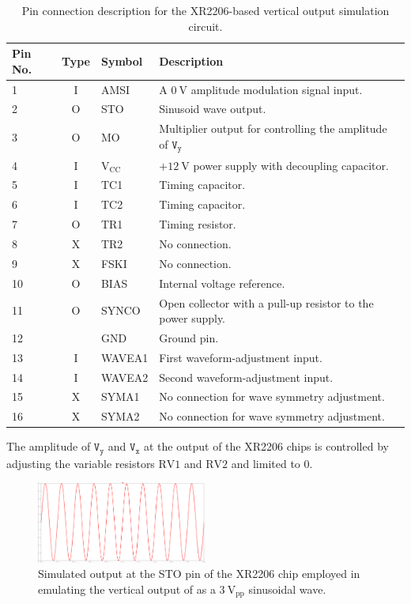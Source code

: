 \documentclass[class=report,11pt,crop=false]{standalone}
\begin{document}
	\begin{table}[ht!]
		\caption{Pin connection description for the XR2206-based vertical output simulation circuit.}
		\label{tab:voec-pin-description}
		\centering
		\begin{tabular}{|m{3em}|c|m{10em}|m{18em}|}
			\hline
			\textbf{Pin No.} & \textbf{Type}	& \textbf{Symbol} & \textbf{Description} \\
			\hline
			1	&	I	& AMSI 	& A $\SI{0}{\volt}$ amplitude modulation signal input.\\
			\hline
			2	&   O	& STO	&	Sinusoid wave output.\\
			\hline
			3	& 	O	& MO	&	Multiplier output for controlling the amplitude of $\texttt{V}_\texttt{y}$\\
			\hline
			4	& 	I	& $\text{V}_{\text{CC}}$ & $+\SI{12}{\volt}$ power supply with decoupling capacitor.\\
			\hline
			5	& 	I	& TC1	&	Timing capacitor.\\
			\hline
			6	&	I	& TC2	& 	Timing capacitor.\\
			\hline
			7	&	O	& TR1	&	Timing resistor.\\
			\hline
			8	&	X	& TR2	&	 No connection.\\
			\hline
			9	&	X	& FSKI	&	No connection.\\  
			\hline
			10	&	O	& BIAS	&	 Internal voltage reference.\\
			\hline
			11	&	O	& SYNCO	&	 Open collector with a pull-up resistor to the power
			supply.\\
			\hline
			12	& 		& GND		& Ground pin.\\
			\hline
			13	&	I	& WAVEA1	&	 First waveform-adjustment input.\\
			\hline
			14	&	I	& WAVEA2	&	Second waveform-adjustment input.\\
			\hline
			15	&	X	& SYMA1		&	 No connection for wave symmetry adjustment.\\
			\hline
			16	&	X	& SYMA2		&	 No connection for wave symmetry adjustment.\\
			\hline
		\end{tabular}
	\end{table}
	The amplitude of $\texttt{V}_\texttt{y}$ and $\texttt{V}_\texttt{x}$ at the output of the XR2206 chips is controlled by adjusting the variable resistors $\text{RV1}$ and $\text{RV2}$ and limited to $0$.
	\begin{figure}[ht!]
		\centering
		\includegraphics[width=0.50\textwidth]{Figures/Methodology/emulator-vertical-output-sinewave}
		\caption{Simulated output at the STO pin of the XR2206 chip employed in emulating the vertical output of as a $3~\text{V}_\text{pp}$ sinusoidal wave.}
		\label{fig:emulator-vertical-output-sinewave}
	\end{figure}
\end{document}
